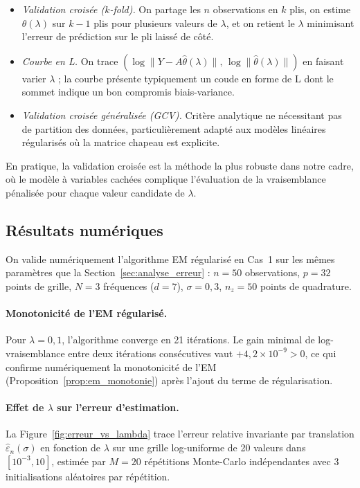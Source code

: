 \documentclass[12pt, a4paper]{article}
\theoremstyle{definition}
\begin{document}
\begin{itemize}
  \item \textit{Validation croisée ($k$-fold).} On partage les $n$ observations en
    $k$ plis, on estime $\theta(\lambda)$ sur $k-1$ plis pour plusieurs valeurs de
    $\lambda$, et on retient le $\lambda$ minimisant l'erreur de prédiction sur le
    pli laissé de côté.
  \item \textit{Courbe en L.} On trace $(\log\|Y - A\hat\theta(\lambda)\|,\,
    \log\|\hat\theta(\lambda)\|)$ en faisant varier $\lambda$ ; la courbe présente
    typiquement un coude en forme de L dont le sommet indique un bon compromis
    biais-variance.
  \item \textit{Validation croisée généralisée (GCV).} Critère analytique ne
    nécessitant pas de partition des données, particulièrement adapté aux modèles
    linéaires régularisés où la matrice chapeau est explicite.
\end{itemize}

En pratique, la validation croisée est la méthode la plus robuste dans notre cadre,
où le modèle à variables cachées complique l'évaluation de la vraisemblance pénalisée
pour chaque valeur candidate de $\lambda$.

\subsection{Résultats numériques}
\label{subsec:resultats_reg}

On valide numériquement l'algorithme EM régularisé en Cas~1 sur les mêmes
paramètres que la Section~\ref{sec:analyse_erreur} :
$n = 50$ observations, $p = 32$ points de grille, $N = 3$ fréquences ($d = 7$),
$\sigma = 0{,}3$, $n_z = 50$ points de quadrature.

\paragraph{Monotonicité de l'EM régularisé.}
Pour $\lambda = 0{,}1$, l'algorithme converge en 21 itérations.
Le gain minimal de log-vraisemblance entre deux itérations consécutives vaut
$+4{,}2 \times 10^{-9} > 0$, ce qui confirme numériquement la monotonicité
de l'EM (Proposition~\ref{prop:em_monotonie}) après l'ajout du terme de
régularisation.

\paragraph{Effet de $\lambda$ sur l'erreur d'estimation.}
La Figure~\ref{fig:erreur_vs_lambda} trace l'erreur relative invariante par
translation $\hat\varepsilon_n(\sigma)$ en fonction de $\lambda$ sur une grille
log-uniforme de 20 valeurs dans $[10^{-3}, 10]$, estimée par $M = 20$ répétitions
Monte-Carlo indépendantes avec 3 initialisations aléatoires par répétition.
\end{document}
